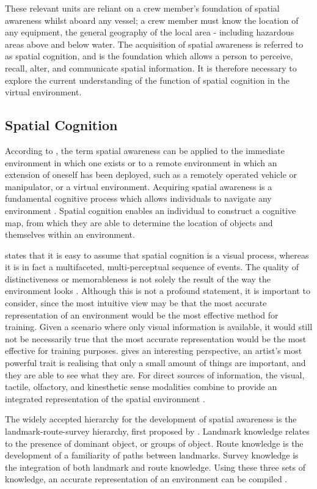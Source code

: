 \documentclass[ %
                    author={Elis Jones},
                supervisor={Dr. Kirsten Cater},
                    degree={BSc},
                     title={The Effect of Presentation Medium on Spatial Cognition},
                  subtitle={in the Virtual Environment},
                      year={2018} ]{dissertation}
\begin{document}
These relevant units are reliant on a crew member's foundation of spatial awareness whilst aboard any vessel; a crew member must know the location of any equipment, the general geography of the local area - including hazardous areas above and below water. The acquisition of spatial awareness is referred to as spatial cognition, and is the foundation which allows a person to perceive, recall, alter, and communicate spatial information. It is therefore necessary to explore the current understanding of the function of spatial cognition in the virtual environment.

\subsection{Spatial Cognition}
According to \cite{stone}, the term spatial awareness can be applied to the immediate environment in which one exists or to a remote environment in which an extension of oneself has been deployed, such as a remotely operated vehicle or manipulator, or a virtual environment. Acquiring spatial awareness is a fundamental cognitive process which allows individuals to navigate any environment \citep{Michael2008}. Spatial cognition enables an individual to construct a cognitive map, from which they are able to determine the location of objects and themselves within an environment. \citep{downs}

 \cite{osberg} states that it is easy to assume that spatial cognition is a visual process, whereas it is in fact a multifaceted, multi-perceptual sequence of events.  The quality of distinctiveness or memorableness is not solely the result of the way the environment looks \citep{downs}. Although this is not a profound statement, it is important to consider, since the most intuitive view may be that the most accurate representation of an environment would be the most effective method for training. Given a scenario where only visual information is available, it would still not be necessarily true that the most accurate representation would be the most effective for training purposes. \cite{gleick} gives an interesting perspective, an artist's most powerful trait is realising that only a small amount of things are important, and they are able to see what they are. For direct sources of information, the visual, tactile, olfactory, and kinesthetic sense modalities combine to provide an integrated representation of the spatial environment \citep{downs}.

The widely accepted hierarchy for the development of spatial awareness is the landmark-route-survey hierarchy, first proposed by \cite{siegel}.  Landmark knowledge relates to the presence of dominant object, or groups of object. Route knowledge is the development of a familiarity of paths between landmarks. Survey knowledge is the integration of both landmark and route knowledge. Using these three sets of knowledge, an accurate representation of an environment can be compiled \citep{stone}.
\end{document}
